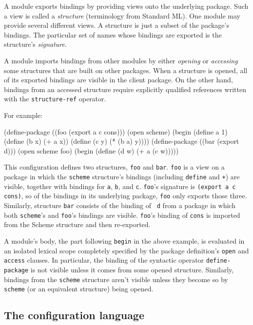 A module exports bindings by providing views onto the underlying
package.  Such a view is called a {\em structure} (terminology from
Standard ML).  One module may provide several different views.  A
structure is just a subset of the package's bindings.  The particular
set of names whose bindings are exported is the structure's {\em
signature}.

A module imports bindings from other modules by either {\em opening}
or {\em accessing} some structures that are built on other packages.
When a structure is opened, all of its exported bindings are visible
in the client package.  On the other hand, bindings from an accessed
structure require explicitly qualified references written with the
{\tt structure-ref} operator.

For example:
\begin{code}
    (define-package ((foo (export a c cons)))
      (open scheme)
      (begin (define a 1)
	     (define (b x) (+ a x))
	     (define (c y) (* (b a) y))))
\codeskip
    (define-package ((bar (export d)))
      (open scheme foo)
      (begin (define (d w) (+ a (c w)))))
\end{code}
This configuration defines two structures, {\tt foo} and {\tt bar}.
{\tt foo} is a view on a package in which the {\tt scheme} structure's
bindings (including {\tt define} and {\tt +}) are visible, together
with bindings for {\tt a}, {\tt b},
and {\tt c}.  {\tt foo}'s signature is {\tt (export a c cons)}, so of
the bindings in its underlying package, {\tt foo} only exports those
three.  Similarly, structure {\tt bar} consists of the binding of {\tt
d} from a package in which both {\tt scheme}'s and {\tt foo}'s
bindings are visible.  {\tt foo}'s binding of {\tt cons} is imported
from the Scheme structure and then re-exported.

A module's body, the part following {\tt begin} in the above example,
is evaluated in an isolated lexical scope completely specified by the
package definition's {\tt open} and {\tt access} clauses.  In
particular, the binding of the syntactic operator {\tt define-package}
is not visible unless it comes from some opened structure.  Similarly,
bindings from the {\tt scheme} structure aren't visible unless they
become so by {\tt scheme} (or an equivalent structure) being opened.


\subsection*{The configuration language}

